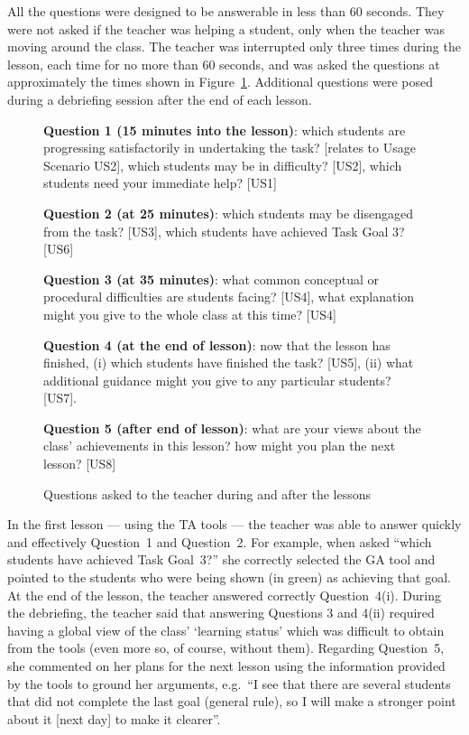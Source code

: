 All the questions were designed to be
answerable in less than 60 seconds. 
They were not asked if the teacher was helping 
a student, only when the teacher was moving around the class. 
The teacher was interrupted only three times during the lesson, each time for no more
than 60 seconds, and was asked the questions at approximately the times shown in
Figure~\ref{fig:summquest}. 
Additional questions were posed during a debriefing session
after the end of each lesson.

\begin{figure}[hbtp]
  \textbf{Question 1 (15 minutes into the lesson)}: which students are
  progressing satisfactorily in undertaking the task? [relates to
  Usage Scenario US2], which students may be in difficulty?
  [US2], which students need your immediate help? [US1]

  \textbf{Question 2 (at 25 minutes)}: which students may be disengaged from the task?
  [US3], which students have achieved Task Goal 3? [US6]

  \textbf{Question 3 (at 35 minutes)}: what common conceptual or procedural
  difficulties are students facing? [US4], what explanation might you
  give to the whole class at this time? [US4]

  \textbf{Question 4 (at the end of lesson)}: now that the lesson has finished,
  (i) which students have finished the task? [US5], 
  (ii) what additional guidance might you give to any particular students? [US7].

  \textbf{Question 5 (after end of lesson)}: what are your views about the
  class' achievements in this lesson? how might you plan the next
  lesson? [US8]

  \caption{Questions asked to the teacher during and after the lessons}
  \label{fig:summquest}
\end{figure}

 

In the first lesson --- using the TA tools --- the
teacher was able to answer quickly and effectively Question~1 and
Question~2. For example, when asked ``which students have achieved Task
Goal~3?'' she correctly selected the GA tool and
pointed to the students who were being shown (in green) as achieving
that goal. At the end of the lesson, the teacher answered correctly
Question~4(i). 
%
During the debriefing, the teacher said that
answering Questions 3 and 4(ii) required having a global view of the
class' `learning status' which was difficult to obtain from the tools (even
more so, of course, without them).
% 
%
Regarding Question~5, she commented on her plans for the next lesson
using the information provided by the tools to ground her arguments, e.g.~``I
see that there are several students that did not complete the last
goal (general rule), so I will make a stronger point about it [next
day] to make it clearer''. 


